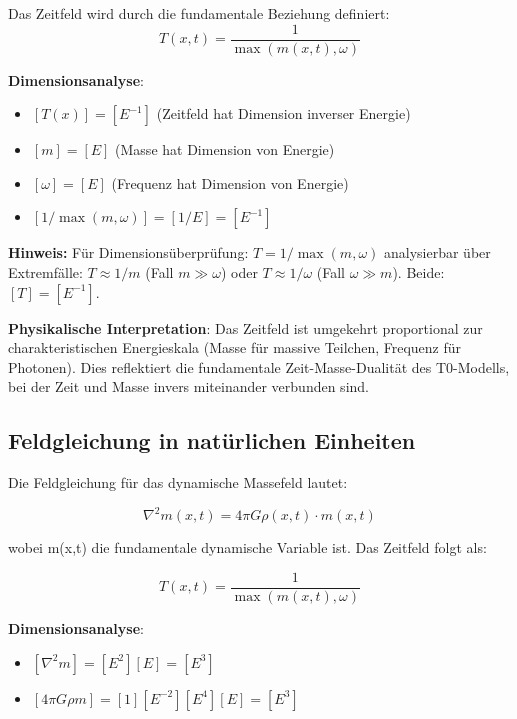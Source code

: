 \documentclass[12pt,a4paper]{article}
\begin{document}
	Das Zeitfeld wird durch die fundamentale Beziehung definiert:
	\begin{equation}
		\label{eq:time_field_fundamental}
		T(x,t) = \frac{1}{\max(m(x,t), \omega)}
	\end{equation}
	
	\textbf{Dimensionsanalyse}: 
	\begin{itemize}
		\item $[T(x)] = [E^{-1}]$ (Zeitfeld hat Dimension inverser Energie)
		\item $[m] = [E]$ (Masse hat Dimension von Energie)
		\item $[\omega] = [E]$ (Frequenz hat Dimension von Energie)
		\item $[1/\max(m, \omega)] = [1/E] = [E^{-1}]$ \checkmark
	\end{itemize}
	\textbf{Hinweis:} Für Dimensionsüberprüfung: $T = 1/\max(m,\omega)$ analysierbar über Extremfälle: $T \approx 1/m$ (Fall $m \gg \omega$) oder $T \approx 1/\omega$ (Fall $\omega \gg m$). Beide: $[T] = [E^{-1}]$.
	
	\textbf{Physikalische Interpretation}: Das Zeitfeld ist umgekehrt proportional zur charakteristischen Energieskala (Masse für massive Teilchen, Frequenz für Photonen). Dies reflektiert die fundamentale Zeit-Masse-Dualität des T0-Modells, bei der Zeit und Masse invers miteinander verbunden sind.
	
	\subsection{Feldgleichung in natürlichen Einheiten}
	\label{subsec:field_equation}
	
	Die Feldgleichung für das dynamische Massefeld lautet:
	
	\begin{equation}
		\label{eq:field_equation}
		\nabla^2 m(x,t) = 4\pi G \rho(x,t) \cdot m(x,t)
	\end{equation}
	
	wobei m(x,t) die fundamentale dynamische Variable ist. Das Zeitfeld folgt als:
	
	\begin{equation}
		T(x,t) = \frac{1}{\max(m(x,t), \omega)}
	\end{equation}
	
	\textbf{Dimensionsanalyse}: 
	\begin{itemize}
		\item $[\nabla^2 m] = [E^2][E] = [E^3]$
		\item $[4\pi G \rho m] = [1][E^{-2}][E^4][E] = [E^3]$ \checkmark
	\end{itemize}
	
\end{document}
